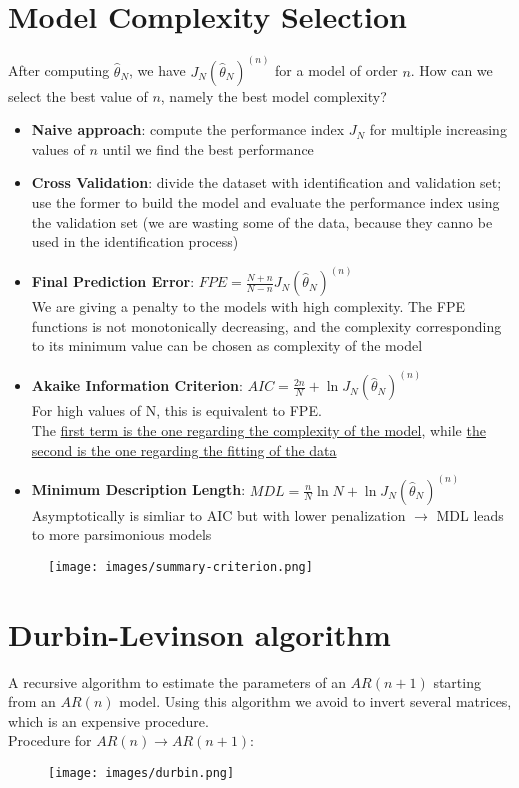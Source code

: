 \documentclass[10pt,a4paper]{article}
\begin{document}
\section{Model Complexity Selection}
After computing $\hat{\theta}_N$, we have $J_N(\hat{\theta}_N)^{(n)}$ for a model of order $n$. How can we select the best value of $n$, namely the best model complexity?
\begin{itemize}
	\item \textbf{Naive approach}: compute the performance index $J_N$ for multiple increasing values of $n$ until we find the best performance
	\item \textbf{Cross Validation}: divide the dataset with identification and validation set; use the former to build the model and evaluate the performance index using the validation set (we are wasting some of the data, because they canno be used in the identification process)
	\item \textbf{Final Prediction Error}: $FPE=\frac{N+n}{N-n}J_N(\hat{\theta}_N)^{(n)}$ \\
	We are giving a penalty to the models with high complexity. The FPE functions is not monotonically decreasing, and the complexity corresponding to its minimum value can be chosen as complexity of the model
	\item \textbf{Akaike Information Criterion}: $AIC=\frac{2n}{N}+\ln{J_N(\hat{\theta}_N)^{(n)}}$ \\ For high values of N, this is equivalent to FPE. \\ The \uline{first term is the one regarding the complexity of the model}, while \uline{the second is the one regarding the fitting of the data}
	\item \textbf{Minimum Description Length}: $MDL=\frac{n}{N}\ln{N}+\ln{J_N(\hat{\theta}_N)^{(n)}}$ \\
	Asymptotically is simliar to AIC but with lower penalization $\rightarrow$ MDL leads to more parsimonious models
\end{itemize}
 \begin{figure}[h!]
 \hfill \texttt{[image: images/summary-criterion.png]}\hspace*{\fill}
  \label{fig:summary-criterion}
\end{figure}
\section{Durbin-Levinson algorithm}
A recursive algorithm to estimate the parameters of an $AR(n+1)$ starting from an $AR(n)$ model. Using this algorithm we avoid to invert several matrices, which is an expensive procedure. \\
Procedure for $AR(n) \rightarrow AR(n+1)$:
 \begin{figure}[h!]
 \hfill \texttt{[image: images/durbin.png]}\hspace*{\fill}
  \label{fig:durbin}
\end{figure} 
\end{document}
